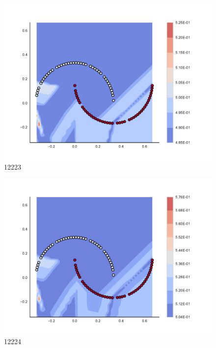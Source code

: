 \begin{subfigure}[b]{0.09\textwidth}
    \includegraphics[clip, trim=2.35cm 1.75cm 4.5cm 0cm,width=\textwidth]{img/convergence/12223.pdf}
    \caption{12223}
    \label{fig:convergence_12223}
\end{subfigure}
%
\begin{subfigure}[b]{0.09\textwidth}
    \includegraphics[clip, trim=2.35cm 1.75cm 4.5cm 0cm,width=\textwidth]{img/convergence/12224.pdf}
    \caption{12224}
    \label{fig:convergence_12224}
\end{subfigure}
%
